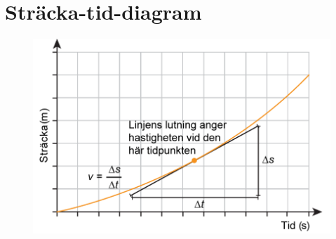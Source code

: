 \documentclass[11pt]{article}
\begin{document}
    \section{Sträcka-tid-diagram}
    \begin{figure}[!h]
        \includegraphics[width=\textwidth]{images/chapter3/DistTime.png}
    \end{figure}
    \clearpage
\end{document}
